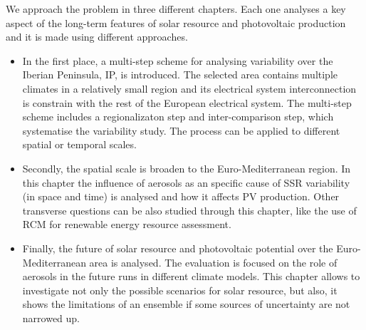 We approach the problem in three different chapters. Each one analyses a key aspect of the long-term features of solar resource and photovoltaic production and it is made using different approaches.

\begin{itemize}
\item In the first place, a multi-step scheme for analysing variability over the Iberian Peninsula, IP, is introduced. The selected area contains multiple climates in a relatively small region and its electrical system interconnection is constrain with the rest of the European electrical system. The multi-step scheme includes a regionalizaton step and inter-comparison step, which systematise the variability study. The process can be applied to different spatial or temporal scales.

\item Secondly, the spatial scale is broaden to the Euro-Mediterranean region. In this chapter the influence of aerosols as an specific cause of SSR variability (in space and time) is analysed and how it affects PV production. Other transverse questions can be also studied through this chapter, like the use of RCM for renewable energy resource assessment.

\item Finally, the future of solar resource and photovoltaic potential over the Euro-Mediterranean area is analysed. The evaluation is focused on the role of aerosols in the future runs in different climate models. This chapter allows to investigate not only the possible scenarios for solar resource, but also, it shows the limitations of an ensemble if some sources of uncertainty are not narrowed up.

\end{itemize}  




